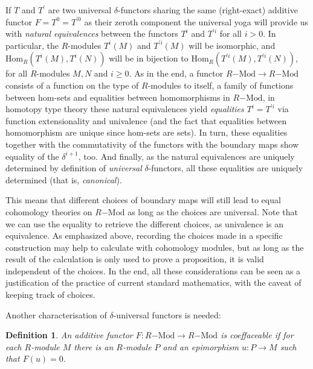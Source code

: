 \documentclass{amsart}
\theoremstyle{plain}
\numberwithin{equation}{section} %
\numberwithin{figure}{section} %
\theoremstyle{plain}
\theoremstyle{plain}
\theoremstyle{plain}
\theoremstyle{plain}
\theoremstyle{plain}
\theoremstyle{plain}
\newtheorem{Def}[thm]{Definition} %
\theoremstyle{remark}
\theoremstyle{remark}
\theoremstyle{remark}
\begin{document}
If $T$ and $T^\prime$ are two universal $\delta$-functors sharing the same (right-exact) additive functor $F = T^0 = T^{\prime 0}$ as their zeroth component the universal yoga will provide us with \textit{natural equivalences} between the functors $T^i$ and $T^{\prime i}$ for all $i > 0$. In particular, the $R$-modules $T^i(M)$ and $T^{\prime i}(M)$ will be isomorphic, and $\mathrm{Hom}_R(T^i(M),T^i(N))$ will be in bijection to $\mathrm{Hom}_R(T^{\prime i}(M),T^{\prime i}(N))$, for all $R$-modules $M, N$ and $i \geq 0$. As in the end, a functor $R\mathrm{-Mod} \rightarrow R\mathrm{-Mod}$ consists of a function on the type of $R$-modules to itself, a family of functions between hom-sets and equalities between homomorphisms in $R\mathrm{-Mod}$, in homotopy type theory these natural equivalences yield \textit{equalities} $T^i = T^{\prime i}$ via function extensionality and univalence (and the fact that equalities between homomorphism are unique since hom-sets are sets). In turn, these equalities together with the commutativity of the functors with the boundary maps show equality of the $\delta^{i+1}$, too. And finally, as the natural equivalences are uniquely determined by definition of \textit{universal} $\delta$-functors, all these equalities are uniquely determined (that is, \textit{canonical}).

This means that different choices of boundary maps will still lead to equal cohomology theories on $R\mathrm{-Mod}$ as long as the choices are universal. Note that we can use the equality to retrieve the different choices, as univalence is an equivalence. As emphasized above, recording the choices made in a specific construction may help to calculate with cohomology modules, but as long as the result of the calculation is only used to prove a proposition, it is valid independent of the choices. In the end, all these considerations can be seen as a justification of the practice of current standard mathematics, with the caveat of keeping track of choices. 

Another characterisation of $\delta$-universal functors is needed:
\begin{Def}
An additive functor $F: R\mathrm{-Mod} \rightarrow R\mathrm{-Mod}$ is coeffaceable if for each $R$-module $M$ there is an $R$-module $P$ and an epimorphism $u: P \rightarrow M$ such that $F(u) = 0$.
\end{Def}
\end{document}

